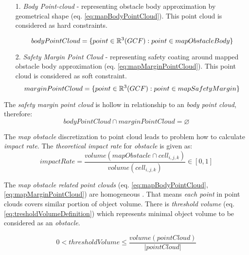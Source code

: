 \begin{itemize}
    \item[1.]\emph{Body Point-cloud} - representing obstacle body approximation by geometrical shape (eq. \ref{eq:mapBodyPointCloud}). This point cloud is considered as hard constraints.
    
    \begin{equation}\label{eq:mapBodyPointCloud}
        body Point Cloud  =\{point\in\mathbb{R}^3(GCF): point \in map Obstacle Body\}
    \end{equation}
    
    \item[2.]\emph{Safety Margin Point Cloud} - representing safety coating around mapped obstacle body approximation (eq. \ref{eq:mapMarginPointCloud}). This point cloud is considered as soft constraint.
    \begin{equation}\label{eq:mapMarginPointCloud}
        margin Point Cloud = \{point\in\mathbb{R}^3(GCF): point \in map Safety Margin\}
    \end{equation}
\end{itemize}

\begin{note}
    The \emph{safety margin point cloud} is hollow in relationship to an \emph{body point cloud}, therefore:
    \begin{equation*}
        body Point Cloud \cap margin Point Cloud  = \varnothing
    \end{equation*}
\end{note}

\noindent The \emph{map obstacle} discretization to point cloud leads to problem how to calculate \emph{impact rate}. The \emph{theoretical impact rate} for \emph{obstacle} is given as:
\begin{equation*}
    impact Rate = \frac{volume(map Obstacle\cap cell_{i,j,k})}{volume(cell_{i,j,k})}\in [0,1]
\end{equation*}

\noindent The \emph{map obstacle related point clouds} (eq. \ref{eq:mapBodyPointCloud}, \ref{eq:mapMarginPointCloud}) are homogeneous \cite{cernamaria2018}. That means \emph{each point} in point clouds covers similar portion of object volume. There is \emph{threshold volume} (eq. \ref{eq:tresholdVolumeDefinition}) which represents minimal object volume to be considered as an \emph{obstacle}.

\begin{equation}\label{eq:tresholdVolumeDefinition}
    0< threshold Volume \le \frac{volume(point Cloud)}{|point Cloud|}
\end{equation}

